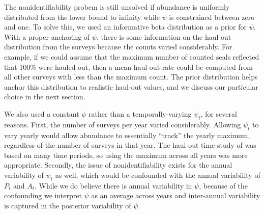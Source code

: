 \documentclass[]{risa}\usepackage[]{graphicx}\usepackage[]{color}
\begin{document}
The nonidentifiability probem is still unsolved if abundance is uniformly distributed from the lower bound to infinity while $\psi$ is constrained between zero and one.  To solve this, we used an informative beta distribution as a prior for $\psi$. With a proper anchoring of $\psi$, there is some information on the haul-out distribution from the surveys because the counts varied considerably. For example, if we could assume that the maximum number of counted seals reflected that 100\% were hauled out, then a mean haul-out rate could be computed from all other surveys with less than the maximum count. The prior distribution helps anchor this distribution to realistic haul-out values, and we discuss our particular choice in the next section.

We also used a constant $\psi$ rather than a temporally-varying $\psi_t$, for several reasons.  First, the number of surveys per year varied considerably.  Allowing $\psi_t$ to vary yearly would allow abundance to essentially ``track'' the yearly maximum, regardless of the number of surveys in that year.  The haul-out time study of \citet{Simp:With:Cesa:Bove:stab:2003} was based on many time periods, so using the maximum across all years was more appropriate.  Secondly, the issue of nonidentifiability exists for the annual variability of $\psi_t$ as well, which would be confounded with the annual variability of $P_t$ and $A_t$.  While we do believe there is annual variability in $\psi$, because of the confounding we interpret $\psi$ as an average across years and inter-annual variability is captured in the posterior variability of $\psi$.
\end{document}
